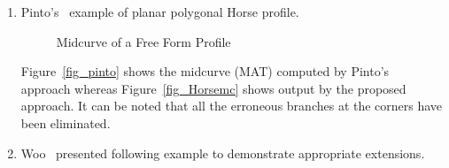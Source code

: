 \begin{enumerate}
%
%
%

\item
Pinto's~\cite{Pinto2009} example of planar polygonal Horse profile. 



\begin{figure}[h!]
\centering     %
{} \quad
{} \quad
\caption{Midcurve of a Free Form Profile}
  \label{fig:midsurfcelljoin:Horsemc}
\end{figure}


Figure~\ref{fig_pinto} shows the midcurve (MAT) computed by Pinto's ~\cite{Pinto2009} approach whereas  Figure~\ref{fig_Horsemc} shows output by the proposed approach. It can be noted that all the erroneous branches at the corners have been eliminated. %


\item
Woo~\cite{Woo2013} presented following example to demonstrate appropriate extensions. 


\end{enumerate}
